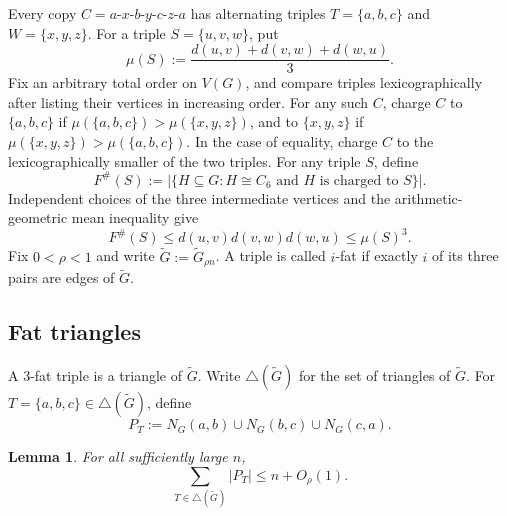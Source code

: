 \documentclass[11pt,letterpaper]{article}
\newtheorem{lemma}[theorem]{Lemma}
\begin{document}
Every copy $C=a$-$x$-$b$-$y$-$c$-$z$-$a$ has alternating triples \(T=\{a,b,c\}\) and \(W=\{x,y,z\}\). For a triple
\(S=\{u,v,w\}\), put
\[
  \mu(S):=\frac{d(u,v)+d(v,w)+d(w,u)}{3}.
\]
Fix an arbitrary total order on \(V(G)\), and compare triples lexicographically after listing their
vertices in increasing order.
For any such \(C\), charge \(C\) to \(\{a,b,c\}\) if
\(\mu(\{a,b,c\})>\mu(\{x,y,z\})\), and to \(\{x,y,z\}\) if
\(\mu(\{x,y,z\})>\mu(\{a,b,c\})\). In the case of equality, charge \(C\) to the lexicographically
smaller of the two triples. For any triple \(S\), define
\[
  F^{\#}(S):=
  |\{H\subseteq G:H\cong C_6\text{ and }H\text{ is charged to }S\}|.
\]
Independent choices of the three intermediate vertices and the arithmetic-geometric mean inequality give
\begin{equation}\label{eq:charge}
  F^{\#}(S)\le d(u,v)d(v,w)d(w,u)\le\mu(S)^3.
\end{equation}
Fix \(0<\rho<1\) and write \(\tilde{G}:=\tilde{G}_{\rho n}\). A triple is called \(i\)-fat if exactly \(i\) of its three pairs are edges of \(\tilde{G}\).

\subsection{Fat triangles}

A 3-fat triple is a triangle of \(\tilde{G}\). Write \(\triangle(\tilde{G})\) for the set of triangles of \(\tilde{G}\). For
\(T=\{a,b,c\}\in\triangle(\tilde{G})\), define
\[
  P_T:=N_G(a,b)\cup N_G(b,c)\cup N_G(c,a).
\]

\begin{lemma}\label{lem:packing}
For all sufficiently large \(n\),
\[
  \sum_{T\in\triangle(\tilde{G})}|P_T|\le n+O_\rho(1).
\]
\end{lemma}
\end{document}
